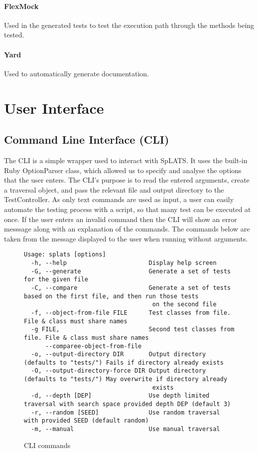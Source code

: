   \paragraph{FlexMock} Used in the generated tests to test the execution path through the methods being tested.
  \paragraph{Yard} Used to automatically generate documentation.
  
  \section{User Interface}
  \subsection{Command Line Interface (CLI)}
  
  The CLI is a simple wrapper used to interact with SpLATS. 
  It uses the built-in Ruby OptionParser class, which allowed us to specify and analyse the options that the user enters. 
  The CLI's purpose is to read the entered arguments, create a traversal object, and pass the relevant file and output directory to the TestController.
  As only text commands are used as input, a user can easily automate the testing process with a script, so that many test can be executed at once.
  If the user enters an invalid command then the CLI will show an error messsage along with an explanation of the commands.
  The commands below are taken from the message displayed to the user when running without arguments.
  \begin{figure}
  \scriptsize
  \begin{verbatim}
Usage: splats [options]
  -h, --help                       Display help screen
  -G, --generate                   Generate a set of tests for the given file
  -C, --compare                    Generate a set of tests based on the first file, and then run those tests
                                    on the second file
  -f, --object-from-file FILE      Test classes from file. File & class must share names
  -g FILE,                         Second test classes from file. File & class must share names
      --comparee-object-from-file
  -o, --output-directory DIR       Output directory (defaults to "tests/") Fails if directory already exists
  -O, --output-directory-force DIR Output directory (defaults to "tests/") May overwrite if directory already
                                    exists
  -d, --depth [DEP]                Use depth limited traversal with search space provided depth DEP (default 3)
  -r, --random [SEED]              Use random traversal with provided SEED (default random)
  -m, --manual                     Use manual traversal
  \end{verbatim}
  \caption{CLI commands}
  \end{figure}
